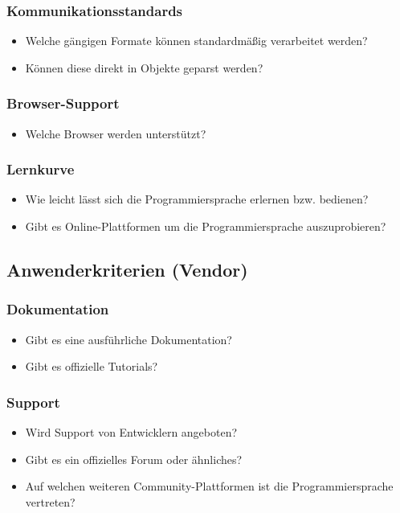 \subsubsection{Kommunikationsstandards}
\begin{itemize}
	\item Welche gängigen Formate können standardmäßig verarbeitet werden?
	\item Können diese direkt in Objekte geparst werden?
\end{itemize}

\subsubsection{Browser-Support}
\begin{itemize}
	\item Welche Browser werden unterstützt?
\end{itemize}

\subsubsection{Lernkurve}
\begin{itemize}
	\item Wie leicht lässt sich die Programmiersprache erlernen bzw. bedienen?
	\item Gibt es Online-Plattformen um die Programmiersprache auszuprobieren?
\end{itemize}
 
\subsection{Anwenderkriterien (Vendor)}
\subsubsection{Dokumentation}
\begin{itemize}
	\item Gibt es eine ausführliche Dokumentation?
	\item Gibt es offizielle Tutorials?
\end{itemize}

\subsubsection{Support}
\begin{itemize}
	\item Wird Support von Entwicklern angeboten?
	\item Gibt es ein offizielles Forum oder ähnliches?
	\item Auf welchen weiteren Community-Plattformen ist die Programmiersprache vertreten? 
\end{itemize}

